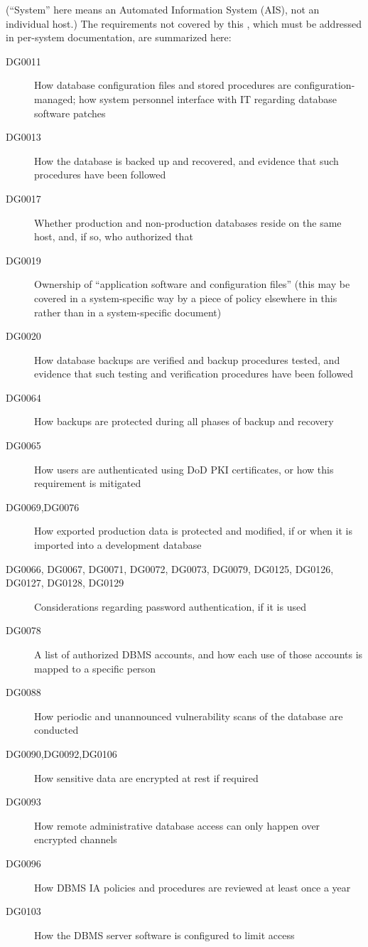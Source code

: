 (``System'' here means an Automated Information System (AIS), not an
individual host.) The requirements not covered by this \CMITSPolicy ,
which must be addressed in per-system documentation, are summarized here:

\begin{description}
\item[DG0011] How database configuration files and stored procedures are
configuration-managed; how system personnel interface with IT regarding
database software patches
\item[DG0013] How the database is backed up and recovered, and evidence
that such procedures have been followed
\item[DG0017] Whether production and non-production databases reside on
the same host, and, if so, who authorized that
\item[DG0019] Ownership of ``application software and configuration
files'' (this may be covered in a system-specific way by a piece of policy
elsewhere in this \CMITSPolicy\, rather than in a system-specific
document)
\item[DG0020] How database backups are verified and backup procedures
tested, and evidence that such testing and verification procedures have
been followed
\item[DG0064] How backups are protected during all phases of backup and
recovery
\item[DG0065] How users are authenticated using DoD PKI certificates, or
how this requirement is mitigated
\item[DG0069,DG0076] How exported production data is protected and
modified, if or when it is imported into a development database
\item[DG0066, DG0067, DG0071, DG0072, DG0073, DG0079, DG0125, DG0126,
DG0127, DG0128, DG0129] Considerations regarding password authentication,
if it is used
\item[DG0078] A list of authorized DBMS accounts, and how each use of
those accounts is mapped to a specific person
\item[DG0088] How periodic and unannounced vulnerability scans of the
database are conducted
\item[DG0090,DG0092,DG0106] How sensitive data are encrypted at rest if required
\item[DG0093] How remote administrative database access can only happen
over encrypted channels
\item[DG0096] How DBMS IA policies and procedures are reviewed at least
once a year
\item[DG0103] How the DBMS server software is configured to limit access

\end{description}
